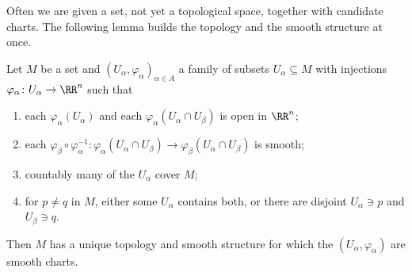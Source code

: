 Often we are given a set, not yet a topological space, together with candidate charts. The following lemma builds the topology and the smooth structure at once.

\begin{lemma}\label{smooth-manifolds:lemma-chart-lemma}
Let $M$ be a set and $(U_\alpha, \varphi_\alpha)_{\alpha \in A}$ a family of subsets $U_\alpha \subseteq M$ with injections $\varphi_\alpha \colon U_\alpha \to \RR^n$ such that
\begin{enumerate}
\item each $\varphi_\alpha(U_\alpha)$ and each $\varphi_\alpha(U_\alpha \cap U_\beta)$ is open in $\RR^n$;
\item each $\varphi_\beta \circ \varphi_\alpha^{-1} \colon \varphi_\alpha(U_\alpha \cap U_\beta) \to \varphi_\beta(U_\alpha \cap U_\beta)$ is smooth;
\item countably many of the $U_\alpha$ cover $M$;
\item for $p \neq q$ in $M$, either some $U_\alpha$ contains both, or there are disjoint $U_\alpha \ni p$ and $U_\beta \ni q$.
\end{enumerate}
Then $M$ has a unique topology and smooth structure for which the $(U_\alpha, \varphi_\alpha)$ are smooth charts.
\end{lemma}

